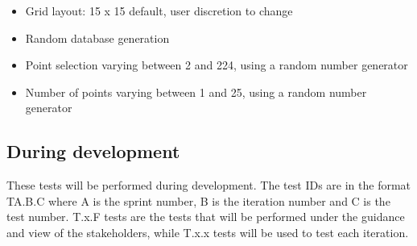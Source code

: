 \begin{itemize}
	\item Grid layout: 15 x 15 default, user discretion to change
	\item Random database generation
	\item Point selection varying between 2 and 224, using a random number generator
	\item Number of points varying between 1 and 25, using a random number generator
\end{itemize}

\subsection{During development}

These tests will be performed during development. The test IDs are in the format TA.B.C where A is the sprint number, B is the iteration number and C is the test number. T.x.F tests are the tests that will be performed under the guidance and view of the stakeholders, while T.x.x tests will be used to test each iteration.

